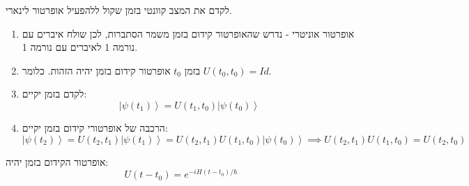 \documentclass{tstextbook}
\begin{document}
\begin{proposition}
לקדם את המצב קוונטי בזמן שקול ללהפעיל אופרטור לינארי.

\end{proposition}
\begin{proposition}
  \begin{enumerate}
    \item אופרטור אוניטרי - נדרש שהאופרטור קידום בזמן משמר הסתברות, לכן שולח איברים עם נורמה 1 לאיברים עם נורמה 1. 


    \item בזמן \(t_{0}\) אופרטור קידום בזמן יהיה הזהות. כלומר \(U(t_{0},t_{0})=Id\). 


    \item לקדם בזמן יקיים: 
$$\left|\psi\left(t_{1}\right)\right\rangle=U\left(t_{1},t_{0}\right)\left|\psi\left(t_{0}\right)\right\rangle$$


    \item הרכבה של אופרטורי קידום בזמן יקיים: 
$$\left|\psi\left(t_{2}\right)\right\rangle=U\left(t_{2},t_{1}\right)\left|\psi\left(t_{1}\right)\right\rangle=U\left(t_{2},t_{1}\right)U\left(t_{1},t_{0}\right)\left|\psi\left(t_{0}\right)\right\rangle \implies U\left(t_{2},t_{1}\right)U\left(t_{1},t_{0}\right)=U\left(t_{2},t_{0}\right)$$


  \end{enumerate}
\end{proposition}
\begin{proposition}
אופרטור הקידום בזמן יהיה:
$$U\left(t-t_{0}\right)=e^{-i H\left(t-t_{0}\right)/\hbar}$$

\end{proposition}
\end{document}
